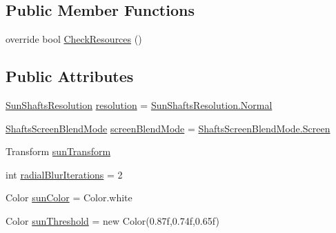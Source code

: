 \subsection*{Public Member Functions}
\begin{DoxyCompactItemize}
\item 
override bool \mbox{\hyperlink{class_unity_standard_assets_1_1_image_effects_1_1_sun_shafts_a46ba317bea3182a8d6ff88a52744ff9c}{Check\+Resources}} ()
\end{DoxyCompactItemize}
\subsection*{Public Attributes}
\begin{DoxyCompactItemize}
\item 
\mbox{\hyperlink{class_unity_standard_assets_1_1_image_effects_1_1_sun_shafts_a6a2e4e71e122d0845ba712e1f3f36b21}{Sun\+Shafts\+Resolution}} \mbox{\hyperlink{class_unity_standard_assets_1_1_image_effects_1_1_sun_shafts_ac4e64d63f2b6f76426ab12a22fc36e3d}{resolution}} = \mbox{\hyperlink{class_unity_standard_assets_1_1_image_effects_1_1_sun_shafts_a6a2e4e71e122d0845ba712e1f3f36b21a960b44c579bc2f6818d2daaf9e4c16f0}{Sun\+Shafts\+Resolution.\+Normal}}
\item 
\mbox{\hyperlink{class_unity_standard_assets_1_1_image_effects_1_1_sun_shafts_a16577ac660a8afd1a280e59000343662}{Shafts\+Screen\+Blend\+Mode}} \mbox{\hyperlink{class_unity_standard_assets_1_1_image_effects_1_1_sun_shafts_ae054ab3f41db3cba79a0ff345f80f9d7}{screen\+Blend\+Mode}} = \mbox{\hyperlink{class_unity_standard_assets_1_1_image_effects_1_1_sun_shafts_a16577ac660a8afd1a280e59000343662a2fc3359e12b2a9104121dcf04246f6a0}{Shafts\+Screen\+Blend\+Mode.\+Screen}}
\item 
Transform \mbox{\hyperlink{class_unity_standard_assets_1_1_image_effects_1_1_sun_shafts_a6eb95c417919671b17ca5d0479c75b65}{sun\+Transform}}
\item 
int \mbox{\hyperlink{class_unity_standard_assets_1_1_image_effects_1_1_sun_shafts_adbae1dcf55616fe0222523185cb6f41d}{radial\+Blur\+Iterations}} = 2
\item 
Color \mbox{\hyperlink{class_unity_standard_assets_1_1_image_effects_1_1_sun_shafts_ab1b244b1a4c8df374cc015ba7c63609e}{sun\+Color}} = Color.\+white
\item 
Color \mbox{\hyperlink{class_unity_standard_assets_1_1_image_effects_1_1_sun_shafts_aada48bd4fbde58529c22ba3907e772bf}{sun\+Threshold}} = new Color(0.\+87f,0.\+74f,0.\+65f)
\item 

\end{DoxyCompactItemize}
